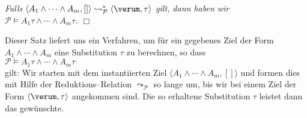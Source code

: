 \begin{Satz}  \label{satz:prolog-korrekt}
{\em
Falls   $\langle A_1 \wedge \cdots \wedge A_m, [] \rangle \leadsto_\mathcal{P}^* \langle \verum, \tau \rangle$ gilt, dann haben wir \\[0.1cm]
\hspace*{1.3cm}  $\mathcal{P} \models A_1\tau \wedge \cdots \wedge A_m\tau$. 
}
\hspace*{\fill} $\Box$
\end{Satz}

Dieser Satz liefert uns ein Verfahren, um f\"{u}r ein gegebenes Ziel der Form \\ $A_1 \wedge \cdots \wedge A_m$ 
eine Substitution $\tau$ zu berechnen, so dass \\[0.1cm]
\hspace*{1.3cm} $\mathcal{P} \models A_1\tau \wedge \cdots \wedge A_m\tau$ \\[0.1cm]
gilt:  Wir starten mit dem instantiierten Ziel $\langle A_1 \wedge \cdots \wedge A_m, []\rangle$ und formen dies mit Hilfe
der Reduktions--Relation $\leadsto_\mathcal{P}$ so lange um, bis wir bei einem Ziel der Form $\langle \verum, \tau\rangle$ angekommen
sind.  Die so erhaltene Substitution $\tau$ leistet dann das gew\"{u}nschte.
\vspace{0.3cm}

